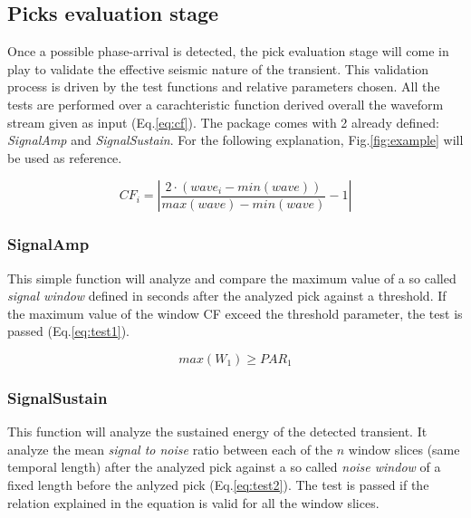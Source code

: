\documentclass[11pt,a4paper,twocolumns]{article}
\begin{document}


\subsection{Picks evaluation stage}
Once a possible phase-arrival is detected, the pick evaluation stage will come in play to validate the effective seismic nature of the transient. This validation process is driven by the test functions and relative  parameters chosen. All the tests are performed over a carachteristic function derived overall the waveform stream given as input (Eq.\ref{eq:cf}). The \bait package comes with \num{2} already defined: \emph{SignalAmp} and \emph{SignalSustain}. For the following explanation, Fig.\ref{fig:example} will be used as reference.

\begin{equation}
	CF_{i}= \left|\frac{2\cdot(wave_{i}-min(wave))}{max(wave)-min(wave)}-1\right|
	\label{eq:cf}
\end{equation}

%
\subsubsection{SignalAmp}
This simple function will analyze and compare the maximum value of a so called \emph{signal window} defined in seconds after the analyzed pick against a threshold. If the maximum value of the window CF  exceed the threshold parameter, the test is passed (Eq.\ref{eq:test1}).

\begin{equation}
	max(W_{1}) \geqslant PAR_{1}
	\label{eq:test1}
\end{equation}

%
\subsubsection{SignalSustain}
This function will analyze the sustained energy of the detected transient. It analyze the mean \emph{signal to noise} ratio between each of the $n$ window slices (same temporal length) after the analyzed pick against a so called \emph{noise window} of a fixed length before the anlyzed pick (Eq.\ref{eq:test2}). The test is passed if the relation explained in the equation is valid for all the window slices.
\end{document}
